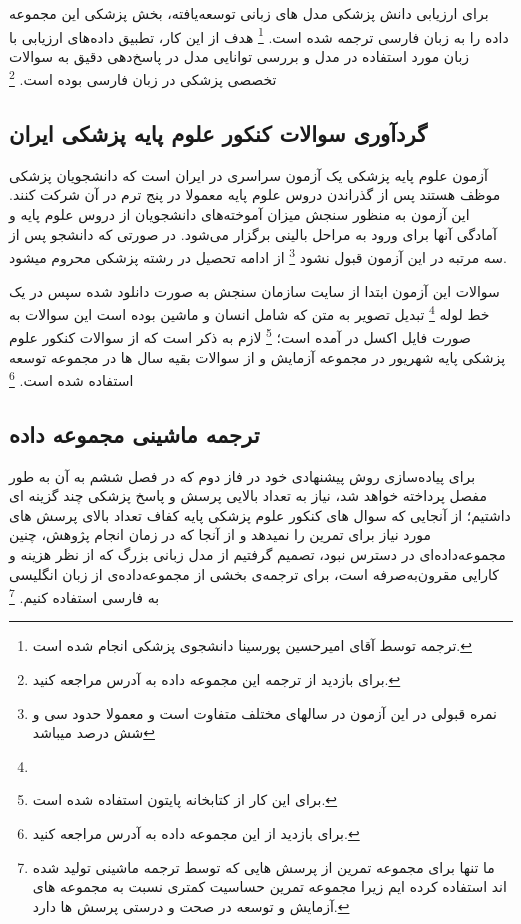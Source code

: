 برای ارزیابی دانش پزشکی مدل های زبانی توسعه‌یافته، بخش پزشکی این مجموعه داده را به زبان فارسی ترجمه شده است.
\footnote{
ترجمه توسط آقای امیرحسین پورسینا دانشجوی پزشکی انجام شده است.
}
 هدف از این کار، تطبیق داده‌های ارزیابی با زبان مورد استفاده در مدل و بررسی توانایی مدل در پاسخ‌دهی دقیق به سوالات تخصصی پزشکی در زبان فارسی بوده است.
\footnote{
برای بازدید از ترجمه این مجموعه داده به آدرس
مراجعه کنید.
 }
\subsection{گردآوری سوالات کنکور علوم پایه پزشکی ایران
}
آزمون علوم پایه پزشکی یک آزمون سراسری در ایران است که دانشجویان پزشکی موظف هستند پس از گذراندن دروس علوم پایه معمولا در پنج ترم در آن شرکت کنند. این آزمون به منظور سنجش میزان آموخته‌های دانشجویان از دروس علوم پایه و آمادگی آنها برای ورود به مراحل بالینی برگزار می‌شود. در صورتی که دانشجو پس از سه مرتبه در این آزمون قبول نشود
\footnote{نمره قبولی در این آزمون در سالهای مختلف متفاوت است و معمولا حدود سی و شش درصد میباشد}
از ادامه تحصیل در رشته پزشکی محروم میشود.

سوالات این آزمون ابتدا از سایت سازمان سنجش به صورت
دانلود شده سپس در یک خط لوله
\footnote{}
تبدیل تصویر به متن که شامل انسان و ماشین بوده است این سوالات به صورت فایل اکسل در آمده است؛
\footnote{برای این کار از کتابخانه
پایتون استفاده شده است.
}
لازم به ذکر است که از سوالات کنکور علوم پزشکی پایه شهریور 
در مجموعه آزمایش و از سوالات بقیه سال ها در مجموعه توسعه استفاده شده است.
\footnote{
	برای بازدید از این مجموعه داده به آدرس
	مراجعه کنید.
}
\subsection{ترجمه ماشینی مجموعه داده
}
برای پیاده‌سازی روش پیشنهادی خود در فاز دوم که در فصل ششم به آن به طور مفصل پرداخته خواهد شد، نیاز به تعداد بالایی پرسش و پاسخ پزشکی چند گزینه ای داشتیم؛ از آنجایی که سوال های کنکور علوم پزشکی پایه کفاف تعداد بالای پرسش های مورد نیاز برای تمرین را نمیدهد و از آنجا که در زمان انجام پژوهش، چنین مجموعه‌داده‌ای در دسترس نبود، تصمیم گرفتیم از مدل زبانی بزرگ 
\cite{b63}
که از نظر هزینه و کارایی مقرون‌به‌صرفه است، برای ترجمه‌ی بخشی از مجموعه‌داده‌ی
\cite{b64}
از زبان انگلیسی به فارسی استفاده کنیم.
\footnote{
ما تنها برای مجموعه تمرین از پرسش هایی که توسط ترجمه ماشینی تولید شده اند استفاده کرده ایم زیرا مجموعه تمرین حساسیت کمتری نسبت به مجموعه های آزمایش و توسعه در صحت و درستی پرسش ها دارد.
}

